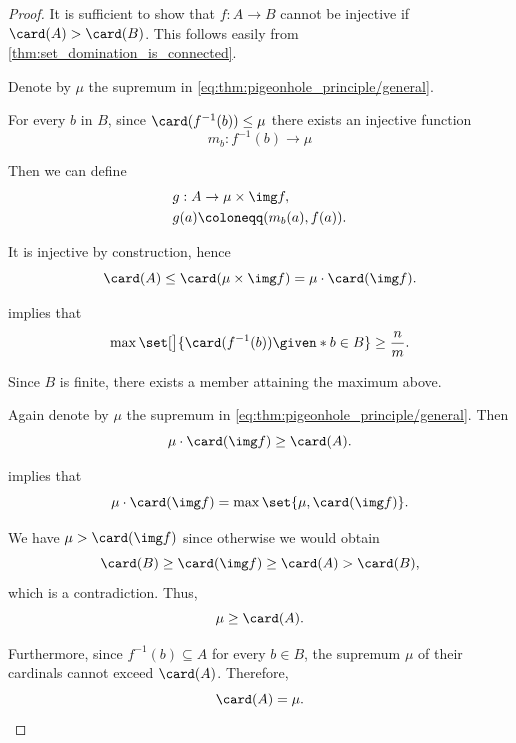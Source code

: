 \begin{proof}
   It is sufficient to show that \( f: A \to B \) cannot be injective if \( \card(A) > \card(B) \). This follows easily from \cref{thm:set_domination_is_connected}.

   Denote by \( \mu \) the supremum in \eqref{eq:thm:pigeonhole_principle/general}.

  For every \( b \) in \( B \), since \( \card(f^{-1}(b)) \leq \mu \) there exists an injective function
  \begin{equation*}
    m_b: f^{-1}(b) \to \mu
  \end{equation*}

  Then we can define
  \begin{equation*}
    \begin{aligned}
      &g: A \to \mu \times \img f, \\
      &g(a) \coloneqq (m_b(a), f(a)).
    \end{aligned}
  \end{equation*}

  It is injective by construction, hence
  \begin{equation*}
    \card(A) \leq \card(\mu \times \img f) = \mu \cdot \card(\img f).
  \end{equation*}

    implies that
  \begin{equation*}
    \max\set[\big]{ \card(f^{-1}(b)) \given* b \in B } \geq \frac n m.
  \end{equation*}

  Since \( B \) is finite, there exists a member attaining the maximum above.

   Again denote by \( \mu \) the supremum in \eqref{eq:thm:pigeonhole_principle/general}. Then
  \begin{equation*}
    \mu \cdot \card(\img f) \geq \card(A).
  \end{equation*}

   implies that
  \begin{equation*}
    \mu \cdot \card(\img f) = \max\set{ \mu, \card(\img f) }.
  \end{equation*}

  We have \( \mu > \card(\img f) \) since otherwise we would obtain
  \begin{equation*}
    \card(B) \geq \card(\img f) \geq \card(A) > \card(B),
  \end{equation*}
  which is a contradiction. Thus,
  \begin{equation*}
    \mu \geq \card(A).
  \end{equation*}

  Furthermore, since \( f^{-1}(b) \subseteq A \) for every \( b \in B \), the supremum \( \mu \) of their cardinals cannot exceed \( \card(A) \). Therefore,
  \begin{equation*}
    \card(A) = \mu.
  \end{equation*}
\end{proof}

